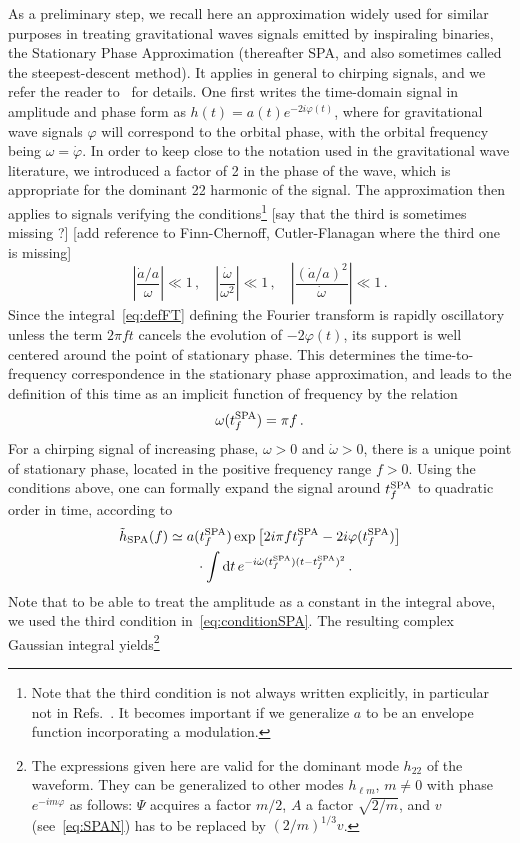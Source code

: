 \documentclass[aps,showpacs,twocolumn,
prd,superscriptaddress,nofootinbib]{revtex4-1}
\newcommand{\be}{\begin{equation}}
\newcommand{\ee}{\end{equation}}
\newcommand\ud{{\mathrm{d}}}
\newcommand{\nn}{\nonumber}
\newcommand{\tfSPA}{t_{f}^{\rm SPA}}
\newcommand{\SM}[1]{{\color{Red} #1}}
\begin{document}
As a preliminary step, we recall here an approximation widely used for similar purposes in treating gravitational waves signals emitted by inspiraling binaries, the Stationary Phase Approximation (thereafter SPA, and also sometimes called the steepest-descent method). It applies in general to chirping signals, and we refer the reader to~\cite{FC93, CF94} for details. One first writes the time-domain signal in amplitude and phase form as $h(t) = a(t) e^{-2i\varphi(t)}$, where for gravitational wave signals $\varphi$ will correspond to the orbital phase, with the orbital frequency being $\omega = \dot{\varphi}$. In order to keep close to the notation used in the gravitational wave literature, we introduced a factor of 2 in the phase of the wave, which is appropriate for the dominant 22 harmonic of the signal. The approximation then applies to signals verifying the conditions\footnote{Note that the third condition is not always written explicitly, in particular not in Refs.~\cite{FC93, CF94}. It becomes important if we generalize $a$ to be an envelope function incorporating a modulation.} \SM{[say that the third is sometimes missing ?]} \SM{[add reference to Finn-Chernoff, Cutler-Flanagan where the third one is missing]}
\be\label{eq:conditionsSPA}
	\left| \frac{\dot{a}/a}{\omega} \right| \ll 1\,, \quad \left|\frac{\dot{\omega}}{\omega^{2}} \right| \ll 1\,, \quad \left| \frac{(\dot{a}/a)^{2}}{\dot{\omega}} \right| \ll 1 \,.
\ee
Since the integral~\eqref{eq:defFT} defining the Fourier transform is rapidly oscillatory unless the term $2\pi f t$ cancels the evolution of $-2\varphi(t)$, its support is well centered around the point of stationary phase. This determines the time-to-frequency correspondence in the stationary phase approximation, and leads to the definition of this time as an implicit function of frequency by the relation
\be\label{eq:deftfSPA}
	\omega(\tfSPA) = \pi  f \,.
\ee
For a chirping signal of increasing phase, $\omega>0$ and $\dot{\omega}>0$, there is a unique point of stationary phase, located in the positive frequency range $f>0$. Using the conditions above, one can formally expand the signal around $\tfSPA$ to quadratic order in time, according to
\begin{align}
	\tilde{h}_{\rm SPA} (f) &\simeq a(\tfSPA) \exp\left[2i\pi f \tfSPA-2i\varphi(\tfSPA) \right] \nn\\
	& \qquad \cdot \int \ud t \, e^{-i \dot{\omega} (\tfSPA) (t-\tfSPA)^{2}} \,.
\end{align}
Note that to be able to treat the amplitude as a constant in the integral above, we used the third condition in~\eqref{eq:conditionSPA}. The resulting complex Gaussian integral yields\footnote{The expressions given here are valid for the dominant mode $h_{22}$ of the waveform. They can be generalized to other modes $h_{\ell m}$, $m\neq 0$ with phase $e^{-im\varphi}$ as follows: $\Psi$ acquires a factor $m/2$, $A$ a factor $\sqrt{2/m}$, and $v$ (see~\eqref{eq:SPAN}) has to be replaced by $(2/m)^{1/3} v$.}
\end{document}
